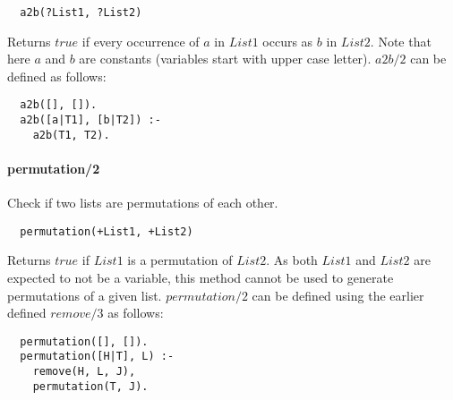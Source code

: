 \documentclass{article}
\begin{document}
\begin{multicols}{2}
  \begin{lstlisting}
  a2b(?List1, ?List2)
  \end{lstlisting}
  
  Returns $true$ if every occurrence of $a$ in $List1$ occurs as $b$ in $List2$. Note that here $a$ and $b$ are constants (variables start with upper case letter). $a2b/2$ can be defined as follows:

  \begin{lstlisting}
  a2b([], []).
  a2b([a|T1], [b|T2]) :-
    a2b(T1, T2).
  \end{lstlisting}   

  \paragraph{permutation/2} Check if two lists are permutations of each other.
  
  \begin{lstlisting}
  permutation(+List1, +List2)
  \end{lstlisting}
  
  Returns $true$ if $List1$ is a permutation of $List2$. As both $List1$ and $List2$ are expected to not be a variable, this method cannot be used to generate permutations of a given list. $permutation/2$ can be defined using the earlier defined $remove/3$ as follows:

  \begin{lstlisting}
  permutation([], []).
  permutation([H|T], L) :-
    remove(H, L, J),
    permutation(T, J).
  \end{lstlisting}  

  \end{multicols}
\end{document}

